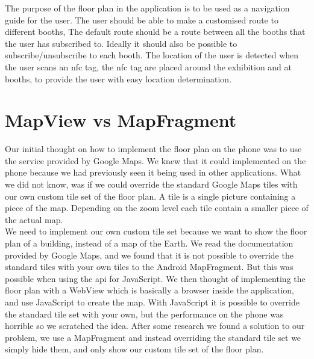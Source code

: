 The purpose of the floor plan in the application is to be used as a navigation guide for the user. The user should be able to make a customised route to different booths, The default route should be a route between all the booths that the user has subscribed to.
Ideally it should also be possible to subscribe/unsubscribe to each booth. The location of the user is detected when the user scans an \ac{nfc} tag, the \ac{nfc} tag are placed around the exhibition and at booths, to provide the user with easy location determination.

\section{MapView vs MapFragment}
Our initial thought on how to implement the floor plan on the phone was to use the service provided by Google Maps. We knew that it could implemented on the phone because we had previously seen it being used in other applications. What we did not know, was if we could override the standard Google Maps tiles with our own custom tile set of the floor plan. A tile is a single picture containing a piece of the map. Depending on the zoom level each tile contain a smaller piece of the actual map.\\
We need to implement our own custom tile set because we want to show the floor plan of a building, instead of a map of the Earth. We read the documentation provided by Google Maps, and we found that it is not possible to override the standard tiles with your own tiles to the Android MapFragment. But this was possible when using the \ac{api} for JavaScript. We then thought of implementing the floor plan with a WebView which is basically a browser inside the application, and use JavaScript to create the map. With JavaScript it is possible to override the standard tile set with your own, but the performance on the phone was horrible so we scratched the idea. After some research we found a solution to our problem, we use a MapFragment and instead overriding the standard tile set we simply hide them, and only show our custom tile set of the floor plan.

